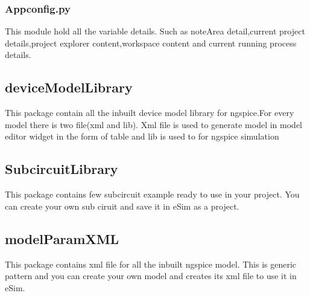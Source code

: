 \documentclass[12pt]{article}
\begin{document}
\subsubsection{Appconfig.py}
This module hold all the variable details. Such as noteArea detail,current project details,project explorer content,workspace content and current running process details.

\subsection{deviceModelLibrary}
This package contain all the inbuilt device model library for ngspice.For every model there is two file(xml and lib). Xml file is used to generate model in model editor widget in the form of table and lib is used to for ngspice simulation


\subsection{SubcircuitLibrary}
This package contains few subcircuit example ready to use in your project. You can create your own sub ciruit and save it in eSim as a project.

\subsection{modelParamXML}
This package contains xml file for all the inbuilt ngspice model. This is generic pattern and you can create your own model and creates its xml file to use it in eSim.
\end{document}
